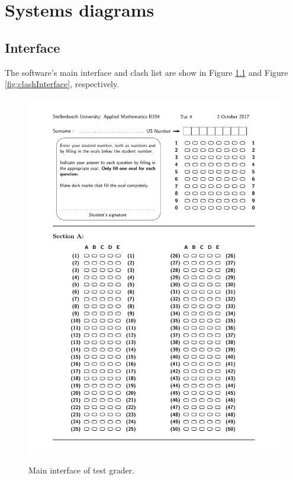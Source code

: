 \chapter{Systems diagrams}
\label{ap:Algorithms}
\graphicspath{{Appendix4/Appendix4figures/}}

\section{Interface}
The software's main interface and clash list are show in Figure \ref{fig:mainInterface} and Figure \ref{fig:clashInterface}, respectively.

\begin{figure}
  \centering
  \includegraphics[width=14cm]{mainInterface}\\
  \caption{Main interface of test grader.}
  \label{fig:mainInterface}
\end{figure}

